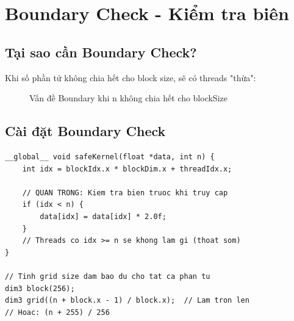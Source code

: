 \section{Boundary Check - Kiểm tra biên}

\subsection{Tại sao cần Boundary Check?}

Khi số phần tử không chia hết cho block size, sẽ có threads "thừa":

\begin{figure}[H]
\centering
{}
\caption{Vấn đề Boundary khi n không chia hết cho blockSize}
\label{fig:boundary_issue}
\end{figure}

\subsection{Cài đặt Boundary Check}

\begin{lstlisting}[caption={Boundary Check trong kernel}, label={lst:boundary_check}]
__global__ void safeKernel(float *data, int n) {
    int idx = blockIdx.x * blockDim.x + threadIdx.x;
    
    // QUAN TRONG: Kiem tra bien truoc khi truy cap
    if (idx < n) {
        data[idx] = data[idx] * 2.0f;
    }
    // Threads co idx >= n se khong lam gi (thoat som)
}

// Tinh grid size dam bao du cho tat ca phan tu
dim3 block(256);
dim3 grid((n + block.x - 1) / block.x);  // Lam tron len
// Hoac: (n + 255) / 256
\end{lstlisting}

